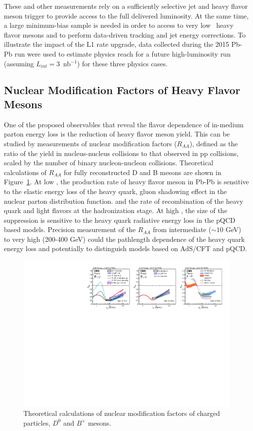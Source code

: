 These and other measurements rely on a sufficiently selective jet and heavy flavor meson trigger to provide access to the full delivered luminosity. At the same time, a large minimum-bias sample is needed in order to access to very low \pt\ heavy flavor mesons and to perform data-driven tracking and jet energy corrections.  To illustrate the impact of the L1 rate upgrade, data collected during the 2015 Pb-Pb run were used to estimate physics reach for a future high-luminosity run (assuming $L_{int} =$3~nb$^{-1}$) for these three physics cases. 


\subsection{Nuclear Modification Factors of Heavy Flavor Mesons}

One of the proposed observables that reveal the flavor dependence of in-medium parton energy loss is the reduction of heavy flavor meson yield. This can be studied by measurements of nuclear modification factors ($R_{AA}$), defined as the ratio of the yield in nucleus-nucleus collisions to that observed in pp collisions, scaled by the number of binary nucleon-nucleon collisions. Theoretical calculations of $R_{AA}$ for fully reconstructed D and B mesons are shown in Figure~\ref{fig:RAA_theory}. At low \pt, the production rate of heavy flavor meson in Pb-Pb is sensitive to the elastic energy loss of the heavy quark, gluon shadowing effect in the nuclear parton distribution function. and the rate of recombination of the heavy quark and light flavors at the hadronization stage. At high \pt, the size of the suppression is sensitive to the heavy quark radiative energy loss in the pQCD based models. Precision measurement of the $R_{AA}$ from intermediate \pt ($\sim 10$ GeV) to very high \pt (200-400 GeV) could the pathlength dependence of the heavy quark energy loss and potentially to distinguish models based on AdS/CFT and pQCD. 

\begin{figure}[!ht]
\begin{center}
\includegraphics[width=.98\textwidth]{figures/cTheoryRAA_BD_v1.pdf}
\caption{Theoretical calculations of nuclear modification factors of charged particles, $D^0$ and $B^+$ mesons.}
\label{fig:RAA_theory}
\end{center}
\end{figure}

